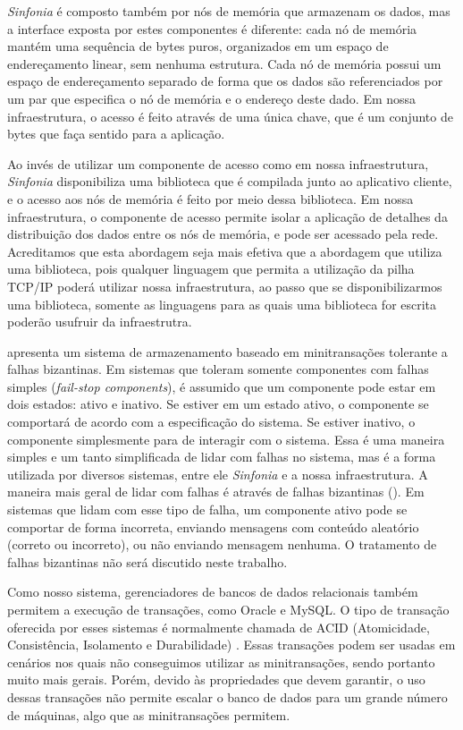 \documentclass[11pt,twoside,a4paper]{book}
\begin{document}
\emph{Sinfonia} é composto também por nós de memória que armazenam os dados, mas a interface exposta por estes componentes é diferente: cada nó de memória mantém uma sequência de bytes puros, organizados em um espaço de endereçamento linear, sem nenhuma estrutura. Cada nó de memória possui um espaço de endereçamento separado de forma que os dados são referenciados por um par que especifica o nó de memória e o endereço deste dado. Em nossa infraestrutura, o acesso é feito através de uma única chave, que é um conjunto de bytes que faça sentido para a aplicação.

Ao invés de utilizar um componente de acesso como em nossa infraestrutura, \emph{Sinfonia} disponibiliza uma biblioteca que é compilada junto ao aplicativo cliente, e o acesso aos nós de memória é feito por meio dessa biblioteca. Em nossa infraestrutura, o componente de acesso permite isolar a aplicação de detalhes da distribuição dos dados entre os nós de memória, e pode ser acessado pela rede. Acreditamos que esta abordagem seja mais efetiva que a abordagem que utiliza uma biblioteca, pois qualquer linguagem que permita a utilização da pilha TCP/IP poderá utilizar nossa infraestrutura, ao passo que se disponibilizarmos uma biblioteca, somente as linguagens para as quais uma biblioteca for escrita poderão usufruir da infraestrutra.

\cite{padilha} apresenta um sistema de armazenamento baseado em minitransações tolerante a falhas bizantinas. Em sistemas que toleram somente componentes com falhas simples (\emph{fail-stop components}), é assumido que um componente pode estar em dois estados: ativo e inativo. Se estiver em um estado ativo, o componente se comportará de acordo com a especificação do sistema. Se estiver inativo, o componente simplesmente para de interagir com o sistema. Essa é uma maneira simples e um tanto simplificada de lidar com falhas no sistema, mas é a forma utilizada por diversos sistemas, entre ele \emph{Sinfonia} e a nossa infraestrutura. A maneira mais geral de lidar com falhas é através de falhas bizantinas (\cite{byzantine}). Em sistemas que lidam com esse tipo de falha, um componente ativo pode se comportar de forma incorreta, enviando mensagens com conteúdo aleatório (correto ou incorreto), ou não enviando mensagem nenhuma. O tratamento de falhas bizantinas não será discutido neste trabalho.

Como nosso sistema, gerenciadores de bancos de dados relacionais também permitem a execução de transações, como Oracle e MySQL. O tipo de transação oferecida por esses sistemas é normalmente chamada de ACID (Atomicidade, Consistência, Isolamento e Durabilidade) \cite{vaca}. Essas transações podem ser usadas em cenários nos quais não conseguimos utilizar as minitransações, sendo portanto muito mais gerais. Porém, devido às propriedades que devem garantir, o uso dessas transações não permite escalar o banco de dados para um grande número de máquinas, algo que as minitransações permitem.
\end{document}
